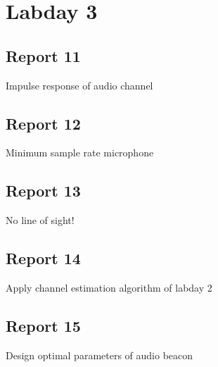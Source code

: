 \documentclass[11pt,titlepage]{report}
\begin{document}
\section{Labday 3}
\subsection{Report 11}
Impulse response of audio channel

\subsection{Report 12}
Minimum sample rate \@ microphone

\subsection{Report 13}
No line of sight!

\subsection{Report 14}
Apply channel estimation algorithm of labday 2

\subsection{Report 15}
Design optimal parameters of audio beacon
\end{document}
